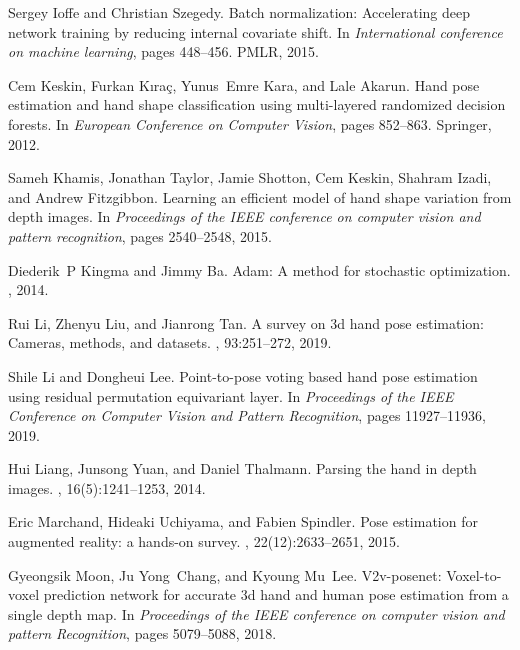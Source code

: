 \documentclass[10pt,twocolumn,letterpaper]{article}
\begin{document}
\begin{thebibliography}{10}
Sergey Ioffe and Christian Szegedy.
\newblock Batch normalization: Accelerating deep network training by reducing
  internal covariate shift.
\newblock In {\em International conference on machine learning}, pages
  448--456. PMLR, 2015.

Cem Keskin, Furkan K{\i}ra{\c{c}}, Yunus~Emre Kara, and Lale Akarun.
\newblock Hand pose estimation and hand shape classification using
  multi-layered randomized decision forests.
\newblock In {\em European Conference on Computer Vision}, pages 852--863.
  Springer, 2012.

Sameh Khamis, Jonathan Taylor, Jamie Shotton, Cem Keskin, Shahram Izadi, and
  Andrew Fitzgibbon.
\newblock Learning an efficient model of hand shape variation from depth
  images.
\newblock In {\em Proceedings of the IEEE conference on computer vision and
  pattern recognition}, pages 2540--2548, 2015.

Diederik~P Kingma and Jimmy Ba.
\newblock Adam: A method for stochastic optimization.
, 2014.

Rui Li, Zhenyu Liu, and Jianrong Tan.
\newblock A survey on 3d hand pose estimation: Cameras, methods, and datasets.
, 93:251--272, 2019.

Shile Li and Dongheui Lee.
\newblock Point-to-pose voting based hand pose estimation using residual
  permutation equivariant layer.
\newblock In {\em Proceedings of the IEEE Conference on Computer Vision and
  Pattern Recognition}, pages 11927--11936, 2019.

Hui Liang, Junsong Yuan, and Daniel Thalmann.
\newblock Parsing the hand in depth images.
, 16(5):1241--1253, 2014.

Eric Marchand, Hideaki Uchiyama, and Fabien Spindler.
\newblock Pose estimation for augmented reality: a hands-on survey.
,
  22(12):2633--2651, 2015.

Gyeongsik Moon, Ju Yong~Chang, and Kyoung Mu~Lee.
\newblock V2v-posenet: Voxel-to-voxel prediction network for accurate 3d hand
  and human pose estimation from a single depth map.
\newblock In {\em Proceedings of the IEEE conference on computer vision and
  pattern Recognition}, pages 5079--5088, 2018.


\end{thebibliography}
\end{document}

